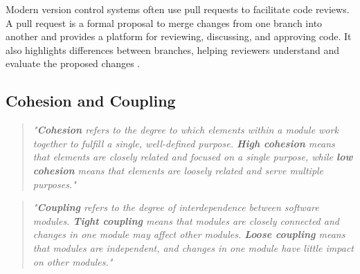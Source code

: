 {Modern version control systems often use pull requests to facilitate code reviews. A pull request is a formal proposal to merge changes from one branch into another and provides a platform for reviewing, discussing, and approving code. It also highlights differences between branches, helping reviewers understand and evaluate the proposed changes \cite{github:pr}.

\subsection{Cohesion and Coupling}
\label{subsec:cohesion-and-coupling}

\begin{quote}
\textit{"\textbf{Cohesion} refers to the degree to which elements within a module work together to fulfill a single, well-defined purpose. \textbf{High cohesion} means that elements are closely related and focused on a single purpose, while \textbf{low cohesion} means that elements are loosely related and serve multiple purposes."} \cite{geeksforgeeks:c&c} \\
\end{quote}

\begin{quote}
\textit{"\textbf{Coupling} refers to the degree of interdependence between software modules. \textbf{Tight coupling} means that modules are closely connected and changes in one module may affect other modules. \textbf{Loose coupling} means that modules are independent, and changes in one module have little impact on other modules."} \cite{geeksforgeeks:c&c} \\
\end{quote}

\begin{figure}[h!]
    \centering


\end{figure}}
